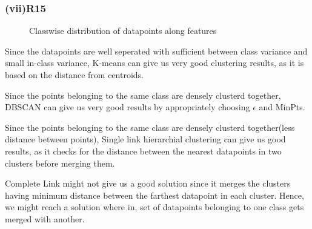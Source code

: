 \documentclass[paper=a4, fontsize=11pt]{scrartcl}
\numberwithin{equation}{section}		%
\numberwithin{figure}{section}			%
\numberwithin{table}{section}				%
\begin{document}
\subsubsection*{(vii)R15}
\begin{figure}[H]
  \centering
  \hfill
  \caption*{Classwise distribution of datapoints along features}
\end{figure}

Since the datapoints are well seperated with sufficient between class variance and small in-class variance, K-means can give us very good clustering results, as it is based on the distance from centroids.

Since the points belonging to the same class are densely clusterd together, DBSCAN can give us very good results by appropriately choosing $\epsilon$ and MinPts.

Since the points belonging to the same class are densely clusterd together(less distance between points), Single link hierarchial clustering can give us good results, as it checks for the distance between the nearest datapoints in two clusters before merging them.

Complete Link might not give us a good solution since it merges the clusters having minimum distance between the farthest datapoint in each cluster. Hence, we might reach a solution where in, set of datapoints belonging to one class gets merged with another.
\end{document}
